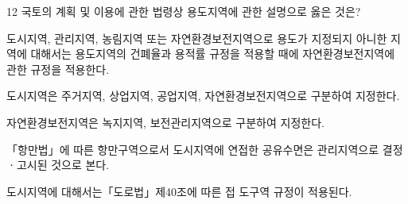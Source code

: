\begin{question}{12}
국토의 계획 및 이용에 관한 법령상 용도지역에 관한 설명으로 옳은 것은?
\begin{choices}
  \item 도시지역, 관리지역, 농림지역 또는 자연환경보전지역으로 용도가 지정되지 아니한 지역에 대해서는 용도지역의 건폐율과 용적률 규정을 적용할 때에 자연환경보전지역에 관한 규정을 적용한다.
  \item 도시지역은 주거지역, 상업지역, 공업지역, 자연환경보전지역으로 구분하여 지정한다.
  \item 자연환경보전지역은 녹지지역, 보전관리지역으로 구분하여 지정한다.
  \item 「항만법」에 따른 항만구역으로서 도시지역에 연접한 공유수면은 관리지역으로 결정ㆍ고시된 것으로 본다.
  \item 도시지역에 대해서는「도로법」제40조에 따른 접 도구역 규정이 적용된다.
\end{choices}
\end{question}
